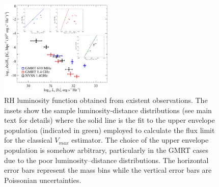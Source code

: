 \documentclass[traditabstract]{aa}
\begin{document}
\begin{appendix}
\begin{figure}[t]
\centering
\includegraphics[width=0.48\textwidth]{figures/RLF_observations.eps}
\caption{RH luminosity function obtained from existent observations. The insets show the sample luminosity-distance distributions (see main text for details) where the solid line is the fit to the upper envelope population (indicated in green) employed to calculate the flux limit for the classical $V_{max}$ estimator. The choice of the upper envelope population is somehow arbitrary, particularly in the GMRT cases due to the poor luminosity--distance distributions. The horizontal error bars represent the mass bins while the vertical error bars are Poissonian uncertainties.}
\label{fig:RLFobs}
\end{figure}

\end{appendix}


\end{document}
